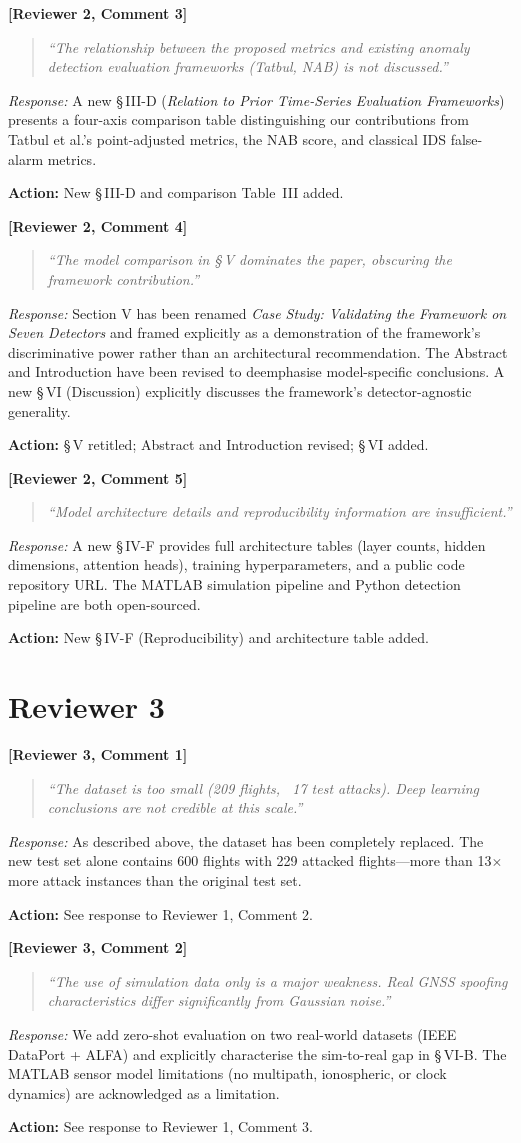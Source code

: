 \documentclass[11pt, a4paper]{article}
\newcommand{\reviewer}[2]{\medskip\noindent\textbf{\textcolor{revcolor}{[Reviewer #1, Comment #2]}}\par}
\newcommand{\response}[1]{\noindent\textit{Response:} #1\par}
\newcommand{\action}[1]{\noindent\textcolor{actcolor}{\textbf{Action:} #1}\smallskip\par}
\newcommand{\quoterev}[1]{\begin{quote}\textit{``#1''}\end{quote}}
\begin{document}
\reviewer{2}{3}
\quoterev{The relationship between the proposed metrics and existing anomaly
  detection evaluation frameworks (Tatbul, NAB) is not discussed.}
\response{%
  A new \S\,III-D (\textit{Relation to Prior Time-Series Evaluation Frameworks})
  presents a four-axis comparison table distinguishing our contributions from
  Tatbul et al.'s point-adjusted metrics, the NAB score, and classical IDS
  false-alarm metrics.}
\action{New \S\,III-D and comparison Table~III added.}

\reviewer{2}{4}
\quoterev{The model comparison in \S\,V dominates the paper, obscuring the
  framework contribution.}
\response{%
  Section V has been renamed \textit{Case Study: Validating the Framework on
  Seven Detectors} and framed explicitly as a demonstration of the framework's
  discriminative power rather than an architectural recommendation.
  The Abstract and Introduction have been revised to deemphasise model-specific
  conclusions. A new \S\,VI (Discussion) explicitly discusses the framework's
  detector-agnostic generality.}
\action{\S\,V retitled; Abstract and Introduction revised; \S\,VI added.}

\reviewer{2}{5}
\quoterev{Model architecture details and reproducibility information are
  insufficient.}
\response{%
  A new \S\,IV-F provides full architecture tables (layer counts, hidden
  dimensions, attention heads), training hyperparameters, and a public code
  repository URL. The MATLAB simulation pipeline and Python detection pipeline
  are both open-sourced.}
\action{New \S\,IV-F (Reproducibility) and architecture table added.}

\section*{Reviewer 3}

\reviewer{3}{1}
\quoterev{The dataset is too small (209 flights, ~17 test attacks). Deep learning
  conclusions are not credible at this scale.}
\response{%
  As described above, the dataset has been completely replaced. The new test
  set alone contains 600 flights with 229 attacked flights—more than
  13$\times$ more attack instances than the original test set.}
\action{See response to Reviewer 1, Comment 2.}

\reviewer{3}{2}
\quoterev{The use of simulation data only is a major weakness.
  Real GNSS spoofing characteristics differ significantly from Gaussian noise.}
\response{%
  We add zero-shot evaluation on two real-world datasets (IEEE DataPort + ALFA)
  and explicitly characterise the sim-to-real gap in \S\,VI-B. The MATLAB
  sensor model limitations (no multipath, ionospheric, or clock dynamics) are
  acknowledged as a limitation.}
\action{See response to Reviewer 1, Comment 3.}
\end{document}
